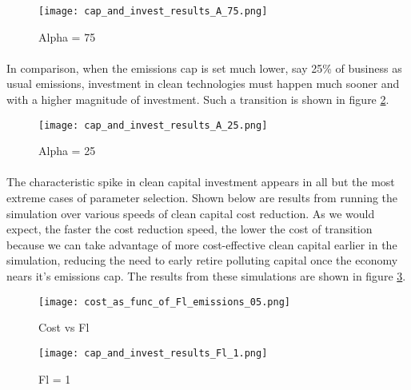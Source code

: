 \documentclass{easychithesis}
\begin{document}
\begin{figure}[h]
\texttt{[image: cap\_and\_invest\_results\_A\_75.png]}
\caption{Alpha = 75\label{fig:SimpleResultsA=75}}
\end{figure}



\FloatBarrier


\paragraph{} In comparison, when the emissions cap is set much lower, say 25\% of business as usual emissions, investment in clean technologies must happen much sooner and with a higher magnitude of investment. Such a transition is shown in figure \ref{fig:SimpleResultsA=25}. 

\begin{figure}[h]
\texttt{[image: cap\_and\_invest\_results\_A\_25.png]}
\caption{Alpha = 25\label{fig:SimpleResultsA=25}}
\end{figure}


\FloatBarrier

\paragraph{} The characteristic spike in clean capital investment appears in all but the most extreme cases of parameter selection. Shown below are results from running the simulation over various speeds of clean capital cost reduction. As we would expect, the faster the cost reduction speed, the lower the cost of transition because we can take advantage of more cost-effective clean capital earlier in the simulation, reducing the need to early retire polluting capital once the economy nears it's emissions cap. The results from these simulations are shown in figure \ref{fig:costVsFl}. 

\begin{figure}[h]
\texttt{[image: cost\_as\_func\_of\_Fl\_emissions\_05.png]}
\caption{Cost vs Fl\label{fig:costVsFl}}
\end{figure}


\begin{figure}[h]
\texttt{[image: cap\_and\_invest\_results\_Fl\_1.png]}
\caption{Fl = 1\label{fig:SimpleResultsFl=1}}
\end{figure}

\FloatBarrier
\end{document}
